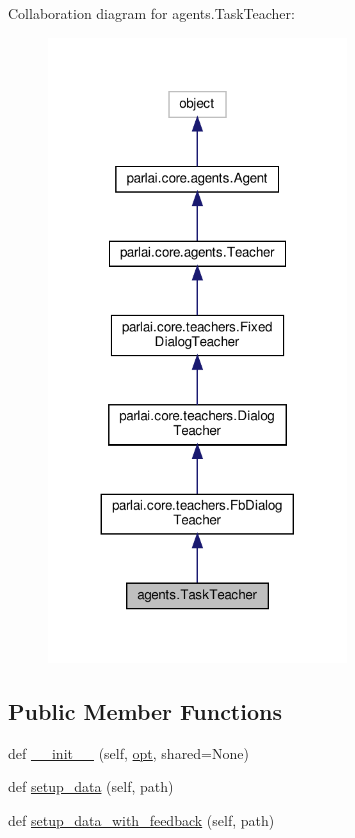 Collaboration diagram for agents.\+Task\+Teacher\+:
\nopagebreak
\begin{figure}[H]
\begin{center}
\leavevmode
\includegraphics[width=224pt]{classagents_1_1TaskTeacher__coll__graph}
\end{center}
\end{figure}
\subsection*{Public Member Functions}
\begin{DoxyCompactItemize}
\item 
def \hyperlink{classagents_1_1TaskTeacher_aef013b21e09f73914431395efa36686c}{\+\_\+\+\_\+init\+\_\+\+\_\+} (self, \hyperlink{classparlai_1_1core_1_1teachers_1_1FbDialogTeacher_af7a9ec497b9cd0292d7b8fa220da7c28}{opt}, shared=None)
\item 
def \hyperlink{classagents_1_1TaskTeacher_aa4657ff478d0f6241272311b3e79351e}{setup\+\_\+data} (self, path)
\item 
def \hyperlink{classagents_1_1TaskTeacher_a5905922070928e411cec76cda82281ec}{setup\+\_\+data\+\_\+with\+\_\+feedback} (self, path)
\end{DoxyCompactItemize}
